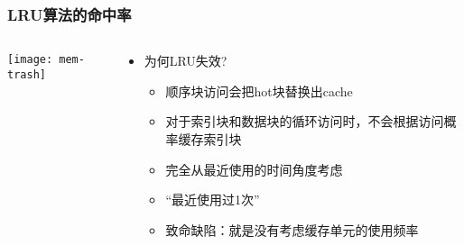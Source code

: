 \begin{frame}[plain]
	\frametitle{LRU算法的命中率}
	\begin{columns}
		\begin{column}{.5\textwidth}
			\centering
			\texttt{[image: mem-trash]}
		\end{column}
		
		\begin{column}{.5\textwidth}
			
			\begin{itemize}
				\item 为何LRU失效?
				\begin{itemize}
					
					\item 顺序块访问会把hot块替换出cache
					\item 对于索引块和数据块的循环访问时，不会根据访问概率缓存索引块
					
					\pause
					
					\item 完全从最近使用的时间角度考虑
					\item “最近使用过1次”
					\item 致命缺陷：就是没有考虑缓存单元的使用频率
				\end{itemize}
			\end{itemize}
			
			
		\end{column}
		
		
	\end{columns}
\end{frame}

